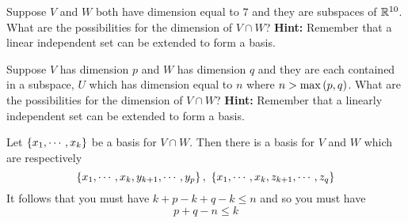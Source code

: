 \begin{enumialphparenastyle}
\begin{ex} Suppose $V$ and $W$ both have dimension equal to $7$ and they are
subspaces of $\mathbb{R}^{10}$. What are the possibilities for the dimension
of $V\cap W$? \textbf{Hint: }Remember that a linear independent set can be
extended to form a basis. \vspace{1mm}
\end{ex}

\begin{ex} Suppose $V$ has dimension $p$ and $W$ has dimension $q$ and they
are each contained in a subspace, $U$ which has dimension equal to $n$ where 
$n>\max \left(p,q\right)$. What are the possibilities for the dimension of 
$V\cap W$? \textbf{Hint: }Remember that a linearly independent set can be
extended to form a basis. \vspace{1mm}
\begin{sol}
Let $\left\{x_{1},\cdots ,x_{k}\right\} $ be a
basis for $V\cap W$. Then there is a basis for $V$ and $W$ which are
respectively
\[
\left\{x_{1},\cdots ,x_{k},y_{k+1},\cdots ,y_{p}\right\} ,\ \left\{
x_{1},\cdots ,x_{k},z_{k+1},\cdots ,z_{q}\right\}
\]
It follows that you must have $k+p-k+q-k\leq n$ and so you must have
\[
p+q-n\leq k
\]
\end{sol}
\end{ex}


\end{enumialphparenastyle}
